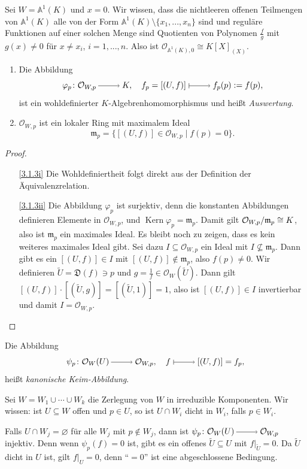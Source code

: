 \documentclass[a4paper,12pt,index=toc]{scrbook}
\theoremstyle{keinenummern} %
\def\A{\mathbb{A}}
\def\O{\mathcal{O}}
\newcommand{\D}{\mathfrak{D}}
\def\m{\mathfrak{m}}
\newcommand{\Kern}{\operatorname{Kern}}
\renewcommand{\phi}{\varphi}
\newcommand{\leer}{\ensuremath{\varnothing}}
\newcommand{\restrict}[1]{|_{#1}}
\renewcommand{\dotsc}{\ensuremath{\!...}}
\newcommand{\schlange}[1]{\widetilde{#1}}
\begin{document}
\begin{bsp}\label{3.1.2}
  Sei $W=\A^1(K)$ und $x=0$. Wir wissen, dass die nichtleeren offenen Teilmengen von $\A^1(K)$ alle von der Form
  $\A^1(K)\setminus\{x_1,\dotsc,x_n\}$ sind und reguläre Funktionen auf einer solchen Menge sind Quotienten von Polynomen
  $\frac{f}{g}$ mit $g(x)\neq0$ für $x\neq x_i$, $i=1,\dotsc,n$. Also ist $\O_{\A^1(K),0}\cong K[X]_{(X)}$.
\end{bsp}

\begin{bem}\label{3.1.3}
  \begin{enumerate}
  \item{} Die Abbildung \[ \phi_{p}\colon \O_{W,p}\ra K,\quad f_p=[(U,f)]\mapsto f_p(p):=f(p), \]
    ist ein wohldefinierter $K$-Algebrenhomomorphismus und heißt \emph{Auswertung}.
  \item{} $\O_{W,p}$ ist ein lokaler Ring mit maximalem Ideal \[ \m_p = \{ [(U,f)]\in\O_{W,p}\mid f(p)=0\}. \]
  \end{enumerate}
\end{bem}
\begin{proof}
  \begin{enumerate}
  \item[\ref{3.1.3i}] Die Wohldefiniertheit folgt direkt aus der Definition der Äquivalenzrelation.
  \item[\ref{3.1.3ii}] Die Abbildung $\phi_p$ ist surjektiv, denn die konstanten Abbildungen definieren Elemente in $\O_{W,p}$,
    und $\Kern \phi_p=\m_p$. Damit gilt $\Quotient{\O_{W,p}}{\m_p}\cong K$, also ist $\m_p$ ein maximales Ideal. Es bleibt noch zu
    zeigen, dass es kein weiteres maximales Ideal gibt. Sei dazu $I\subseteq\O_{W,p}$ ein Ideal mit $I\not\subseteq \m_p$. Dann
    gibt es ein $[(U,f)]\in I$ mit $[(U,f)]\notin \m_p$, also $f(p)\neq0$. Wir definieren $\schlange{U}=\D(f)\ni p$ und
    $g=\frac1f\in\O_W(\schlange{U})$. Dann gilt $[(U,f)]\cdot[(\schlange{U},g)]=[(\schlange{U},1)]=1$, also ist $[(U,f)]\in I$
    invertierbar und damit $I=\O_{W,p}$.
  \end{enumerate}
\end{proof}

\begin{bem}\label{3.1.4}
  Die Abbildung \[ \psi_p\colon \O_W(U)\ra\O_{W,p},\quad f\mapsto[(U,f)]=f_p, \] heißt \emph{kanonische Keim-Abbildung}.

  Sei $W=W_1\cup\dotsm\cup W_k$ die Zerlegung von $W$ in irreduzible Komponenten. Wir wissen: ist $U\subseteq W$ offen und $p\in
  U$, so ist $U\cap W_i$ dicht in $W_i$, falls $p\in W_i$.

  Falls $U\cap W_j=\leer$ für alle $W_j$ mit $p\notin W_j$, dann ist $\psi_p\colon\O_W(U)\ra\O_{W,p}$ injektiv. Denn wenn
  $\psi_p(f)=0$ ist, gibt es ein offenes $\schlange{U}\subseteq U$ mit $f\restrict{\schlange{U}}=0$. Da $\schlange{U}$ dicht in $U$ ist,
  gilt $f\restrict{U}=0$, denn \enquote{$=0$} ist eine abgeschlossene Bedingung.
\end{bem}
\end{document}
